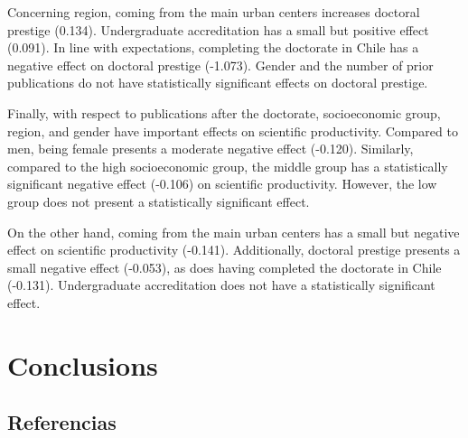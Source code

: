 \documentclass[
  spanish,
  12pt,
  letterpaper,
]{article}
\begin{document}
Concerning region, coming from the main urban centers increases doctoral
prestige (0.134). Undergraduate accreditation has a small but positive
effect (0.091). In line with expectations, completing the doctorate in
Chile has a negative effect on doctoral prestige (-1.073). Gender and
the number of prior publications do not have statistically significant
effects on doctoral prestige.

Finally, with respect to publications after the doctorate, socioeconomic
group, region, and gender have important effects on scientific
productivity. Compared to men, being female presents a moderate negative
effect (-0.120). Similarly, compared to the high socioeconomic group,
the middle group has a statistically significant negative effect
(-0.106) on scientific productivity. However, the low group does not
present a statistically significant effect.

On the other hand, coming from the main urban centers has a small but
negative effect on scientific productivity (-0.141). Additionally,
doctoral prestige presents a small negative effect (-0.053), as does
having completed the doctorate in Chile (-0.131). Undergraduate
accreditation does not have a statistically significant effect.

\section{Conclusions}\label{conclusions}

\subsection{Referencias}\label{referencias}

\printbibliography[heading=none]
\end{document}
